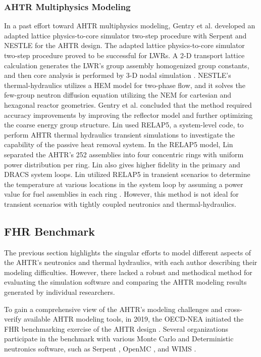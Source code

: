 \subsubsection{AHTR Multiphysics Modeling}
In a past effort toward \gls{AHTR} multiphysics modeling, Gentry et al. 
\cite{gentry_development_2016} developed an adapted lattice physics-to-core 
simulator two-step procedure with Serpent \cite{leppanen_serpent_2014} 
and \gls{NESTLE} \cite{turinsky_nestle_1994} for the \gls{AHTR} design. 
The adapted lattice physics-to-core simulator two-step procedure proved to be 
successful for \glspl{LWR}. A 2-D transport lattice calculation generates the 
\gls{LWR}'s group assembly homogenized group constants, and then core 
analysis is performed by 3-D nodal simulation 
\cite{koebke_new_1980,gentry_development_2016}.
\gls{NESTLE}'s thermal-hydraulics utilizes a \gls{HEM} model for two-phase 
flow, and it solves the few-group neutron diffusion equation utilizing the
\gls{NEM} for cartesian and hexagonal reactor geometries.  
Gentry et al. concluded that the method required accuracy improvements 
by improving the reflector model and further optimizing the coarse energy group 
structure.
Lin \cite{lin_thermal_2020} used RELAP5, a system-level code, to perform 
\gls{AHTR} thermal hydraulics transient simulations to investigate the 
capability of the passive heat removal system. 
In the RELAP5 model, Lin separated the \gls{AHTR}'s 252 assemblies into 
four concentric rings with uniform power distribution per ring. 
Lin also gives higher fidelity in the primary and \gls{DRACS} system loops. 
Lin utilized RELAP5 in transient scenarios to determine 
the temperature at various locations in the system loop by assuming a power 
value for fuel assemblies in each ring \cite{lin_thermal_2020}. 
However, this method is not ideal for transient scenarios with tightly coupled 
neutronics and thermal-hydraulics. 

\subsection{FHR Benchmark}
The previous section highlights the singular efforts to model 
different aspects of the \gls{AHTR}'s neutronics and thermal hydraulics, with
each author describing their modeling difficulties. 
However, there lacked a robust and methodical method for evaluating the 
simulation software and comparing the \gls{AHTR} modeling results generated by 
individual researchers.

To gain a comprehensive view of the \gls{AHTR}'s modeling challenges and 
cross-verify available \gls{AHTR} modeling tools, in 2019, the 
\gls{OECD}-\gls{NEA} initiated the \gls{FHR} benchmarking exercise 
of the \gls{AHTR} design \cite{petrovic_benchmark_2021}.
Several organizations participate in the benchmark with various Monte Carlo
and Deterministic neutronics software, such as Serpent \cite{leppanen_serpent_2014}, 
OpenMC \cite{romano_openmc_2013}, and WIMS \cite{lindley_current_2017}. 

